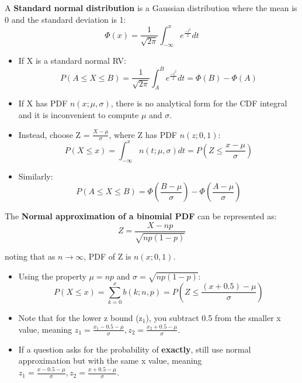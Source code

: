 \documentclass[10pt, letterpaper, twoside]{article}
\begin{document}
\begin{multicols}{2}
    

A \textbf{Standard normal distribution} is a Gaussian distribution where the mean is 0 and the standard deviation is 1:
\begin{equation*}
\Phi(x) = \frac{1}{\sqrt{2\pi}}\int_{-\infty}^xe^{\frac{-t^2}{2}}dt
\end{equation*}

\begin{itemize}
    \item If X is a standard normal RV:
    \begin{equation*}
        P(A\leq X\leq B) = \frac{1}{\sqrt{2\pi}}\int_{A}^Be^{\frac{-t^2}{2}}dt = \Phi(B) - \Phi(A)
    \end{equation*}
    \item If X has PDF $n(x;\mu,\sigma)$, there is no analytical form for the CDF integral and it is inconvenient to compute $\mu$ and $\sigma$. 
    \item Instead, choose Z = $\frac{X - \mu}{\sigma}$, where Z has PDF $n(z;0,1)$:
    \begin{equation*}
        P(X\leq x) = \int_{-\infty}^xn(t;\mu,\sigma)dt = P(Z\leq\frac{x-\mu}{\sigma})
    \end{equation*}
    \item Similarly:
    \begin{equation*}
        P(A\leq X\leq B) = \Phi(\frac{B-\mu}{\sigma}) - \Phi(\frac{A-\mu}{\sigma})
    \end{equation*}
\end{itemize}

The \textbf{Normal approximation of a binomial PDF} can be represented as:
\begin{equation*}
    Z = \frac{X - np}{\sqrt{np(1-p)}}
\end{equation*}

\noindent noting that as $n \rightarrow \infty$, PDF of Z is $n(x;0,1)$.

\begin{itemize}
    \item Using the property $\mu = np$ and $\sigma = \sqrt{np(1-p)}$:
    \begin{equation*}
        P(X \leq x) = \sum_{k=0}^xb(k;n,p) = P(Z\leq\frac{(x+0.5) - \mu}{\sigma})
    \end{equation*}
    \item Note that for the lower z bound (z$_1$), you subtract 0.5 from the smaller x value, meaning $z_1 = \frac{x_1 - 0.5 - \mu}{\sigma}, z_2 = \frac{x_2 + 0.5 - \mu}{\sigma}$.
    \item If a question asks for the probability of \textbf{exactly}, still use normal approximation but with the same x value, meaning $z_1 = \frac{x - 0.5 - \mu}{\sigma}, z_2 = \frac{x + 0.5 - \mu}{\sigma}$.
\end{itemize}


\end{multicols}
\end{document}
